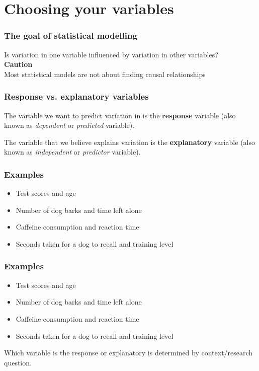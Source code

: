 \documentclass{beamer}
\begin{document}
\section{Choosing your variables}
\begin{frame}
  \frametitle{The goal of statistical modelling}
Is variation in one variable influenced by variation in other variables? \\ \vspace{1cm}
\large{\alert{\textbf{Caution}} \\ Most statistical models are not about finding causal relationships}
\end{frame}
\begin{frame}
\frametitle{Response vs. explanatory variables}
The variable we want to predict variation in is the \textbf{response} variable
(also known as \textit{dependent} or \textit{predicted} variable).\\

\vspace{1cm}

The variable that we believe explains variation is the \textbf{explanatory} variable
(also known as \textit{independent} or \textit{predictor} variable).\\

\end{frame}
\begin{frame}
\frametitle{Examples}
\begin{itemize}
  \item<1-> Test scores and age
  \item<2-> Number of dog barks and time left alone
  \item<3-> Caffeine consumption and reaction time
  \item<4> Seconds taken for a dog to recall and training level
\end{itemize}
\vspace{1cm}
\end{frame}
\begin{frame}
\frametitle{Examples}
\begin{itemize}
  \item Test scores and age
  \item Number of dog barks and time left alone
  \item Caffeine consumption and reaction time
  \item Seconds taken for a dog to recall and training level
\end{itemize}
\vspace{1cm}
Which variable is the response or explanatory is determined by context/research question.
\end{frame}
\end{document}
